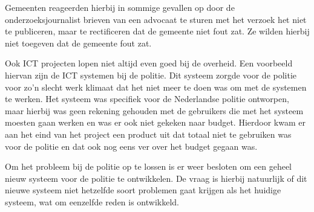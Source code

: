 Gemeenten reageerden hierbij in sommige gevallen op door de onderzoeksjournalist brieven van een advocaat te sturen met het verzoek het niet te publiceren, maar te rectificeren dat de gemeente niet fout zat. Ze wilden hierbij niet toegeven dat de gemeente fout zat.

Ook ICT projecten lopen niet altijd even goed bij de overheid. Een voorbeeld hiervan zijn de ICT systemen bij de politie\cite{bib.tweakers.politie}. Dit systeem zorgde voor de politie voor zo'n slecht werk klimaat dat het niet meer te doen was om met de systemen te werken. Het systeem was specifiek voor de Nederlandse politie ontworpen, maar hierbij was geen rekening gehouden met de gebruikers die met het systeem moesten gaan werken en was er ook niet gekeken naar budget. Hierdoor kwam er aan het eind van het project een product uit dat totaal niet te gebruiken was voor de politie en dat ook nog eens ver over het budget gegaan was. 

Om het probleem bij de politie op te lossen is er weer besloten om een geheel nieuw systeem voor de politie te ontwikkelen. De vraag is hierbij natuurlijk of dit nieuwe systeem niet hetzelfde soort problemen gaat krijgen als het huidige systeem, wat om eenzelfde reden is ontwikkeld.


